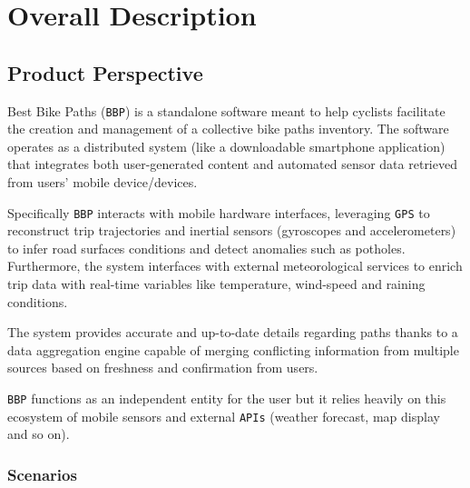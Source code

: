 \chapter{Overall Description}
\label{ch:overall}

\section{Product Perspective}
\label{sec:perspective}

Best Bike Paths (\texttt{BBP}) is a standalone software meant to help cyclists facilitate the creation and management of a collective bike paths inventory. The software operates as a distributed system (like a downloadable smartphone application) that integrates both user-generated content and automated sensor data retrieved from users' mobile device/devices.

Specifically \texttt{BBP} interacts with mobile hardware interfaces, leveraging \texttt{GPS} to reconstruct trip trajectories and inertial sensors (gyroscopes and accelerometers) to infer road surfaces conditions and detect anomalies such as potholes. Furthermore, the system interfaces with external meteorological services to enrich trip data with real-time variables like temperature, wind-speed and raining conditions.

The system provides accurate and up-to-date details regarding paths thanks to a data aggregation engine capable of merging conflicting information from multiple sources based on freshness and confirmation from users.

\texttt{BBP} functions as an independent entity for the user but it relies heavily on this ecosystem of mobile sensors and external \texttt{APIs} (weather forecast, map display and so on).

\subsection{Scenarios}
\label{sec:scenarios}

